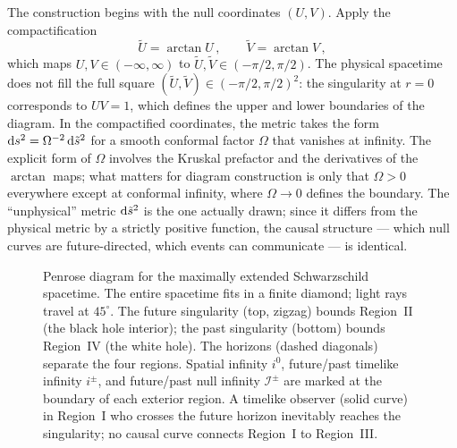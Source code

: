 The construction begins with the null coordinates $(U, V)$.  Apply
the compactification
%
\begin{equation}
  \tilde{U} = \arctan U \,, \qquad
  \tilde{V} = \arctan V \,,
  \label{eq:penrose-compactify}
\end{equation}
%
which maps $U, V \in (-\infty, \infty)$ to
$\tilde{U}, \tilde{V} \in (-\pi/2, \pi/2)$.  The physical spacetime
does not fill the full square
$(\tilde{U}, \tilde{V}) \in (-\pi/2, \pi/2)^2$: the singularity at
$r = 0$ corresponds to $UV = 1$, which defines the upper and lower
boundaries of the diagram.  In the compactified coordinates, the metric
takes the form $\mathrm{d} s^2 = \Omega^{-2}\,\mathrm{d}\tilde{s}^2$ for a smooth
conformal factor $\Omega$ that vanishes at infinity.  The explicit form
of $\Omega$ involves the Kruskal prefactor and the derivatives of the
$\arctan$ maps; what matters for diagram construction is only that
$\Omega > 0$ everywhere except at conformal infinity, where
$\Omega \to 0$ defines the boundary.  The ``unphysical'' metric
$\mathrm{d}\tilde{s}^2$ is the one actually drawn; since it differs from the
physical metric by a strictly positive function, the causal structure
--- which null curves are future-directed, which events can communicate
--- is identical.

%
\begin{figure}[htbp]
  \centering
  
  \caption[Penrose diagram for the maximally extended Schwarzschild spacetime]{%
    Penrose diagram for the maximally extended Schwarzschild spacetime.
    The entire spacetime fits in a finite diamond; light rays travel at
    $45^\circ$.  The future singularity (top, zigzag) bounds Region~II
    (the black hole interior); the past singularity (bottom) bounds
    Region~IV (the white hole).  The horizons (dashed diagonals) separate
    the four regions.  Spatial infinity $i^0$, future/past timelike
    infinity $i^\pm$, and future/past null infinity $\mathscr{I}^\pm$ are
    marked at the boundary of each exterior region.  A timelike observer
    (solid curve) in Region~I who crosses the future horizon inevitably
    reaches the singularity; no causal curve connects Region~I to
    Region~III.}
  \label{fig:penrose-schwarzschild}
\end{figure}

